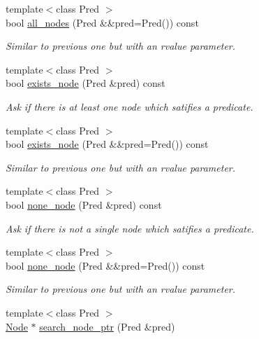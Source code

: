 \begin{DoxyCompactItemize}
{\footnotesize template$<$class Pred $>$ }\\bool \hyperlink{class_designar_1_1_base_graph_a32419ec17712a60c1964bc91e78d135c}{all\+\_\+nodes} (Pred \&\&pred=Pred()) const
\begin{DoxyCompactList}\small\item\em Similar to previous one but with an rvalue parameter. \end{DoxyCompactList}\item 
{\footnotesize template$<$class Pred $>$ }\\bool \hyperlink{class_designar_1_1_base_graph_a3631470de61b819211c72fdd2ac31b34}{exists\+\_\+node} (Pred \&pred) const
\begin{DoxyCompactList}\small\item\em Ask if there is at least one node which satifies a predicate. \end{DoxyCompactList}\item 
{\footnotesize template$<$class Pred $>$ }\\bool \hyperlink{class_designar_1_1_base_graph_a62df2c7ec71d2b009e96f8974968a3fc}{exists\+\_\+node} (Pred \&\&pred=Pred()) const
\begin{DoxyCompactList}\small\item\em Similar to previous one but with an rvalue parameter. \end{DoxyCompactList}\item 
{\footnotesize template$<$class Pred $>$ }\\bool \hyperlink{class_designar_1_1_base_graph_aa87c903e7fbf82a30edc9e442a115050}{none\+\_\+node} (Pred \&pred) const
\begin{DoxyCompactList}\small\item\em Ask if there is not a single node which satifies a predicate. \end{DoxyCompactList}\item 
{\footnotesize template$<$class Pred $>$ }\\bool \hyperlink{class_designar_1_1_base_graph_a394cdb81d0b0402e348dc87d2456d2d7}{none\+\_\+node} (Pred \&\&pred=Pred()) const
\begin{DoxyCompactList}\small\item\em Similar to previous one but with an rvalue parameter. \end{DoxyCompactList}\item 
{\footnotesize template$<$class Pred $>$ }\\\hyperlink{namespace_designar_a5af326c65aa2bd26b26c410f2030d09e}{Node} $\ast$ \hyperlink{class_designar_1_1_base_graph_aa15b13f58a4961b1593045d1e228adec}{search\+\_\+node\+\_\+ptr} (Pred \&pred)

\end{DoxyCompactItemize}

